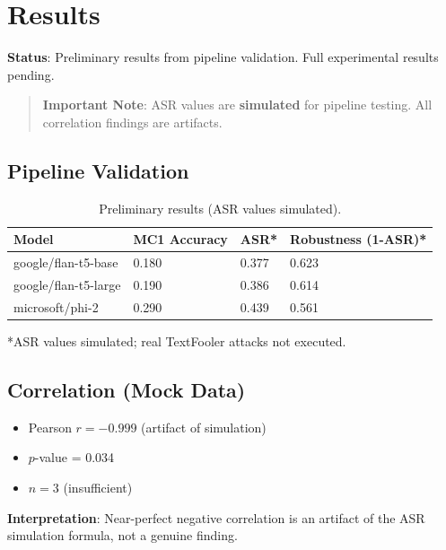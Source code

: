 \section{Results}

\textbf{Status}: Preliminary results from pipeline validation. Full experimental results pending.

\begin{quote}
\textbf{Important Note}: ASR values are \textbf{simulated} for pipeline testing. All correlation findings are artifacts.
\end{quote}

\subsection{Pipeline Validation}

\begin{table}[t]
\centering
\caption{Preliminary results (ASR values simulated).}
\label{tab:results}
\begin{tabular}{@{}llll@{}}
\toprule
Model & MC1 Accuracy & ASR* & Robustness (1-ASR)* \\
\midrule
google/flan-t5-base & 0.180 & 0.377 & 0.623 \\
google/flan-t5-large & 0.190 & 0.386 & 0.614 \\
microsoft/phi-2 & 0.290 & 0.439 & 0.561 \\
\bottomrule
\end{tabular}
\end{table}

*ASR values simulated; real TextFooler attacks not executed.

\subsection{Correlation (Mock Data)}

\begin{itemize}
    \item Pearson $r = -0.999$ (artifact of simulation)
    \item $p$-value = 0.034
    \item $n = 3$ (insufficient)
\end{itemize}

\textbf{Interpretation}: Near-perfect negative correlation is an artifact of the ASR simulation formula, not a genuine finding.
